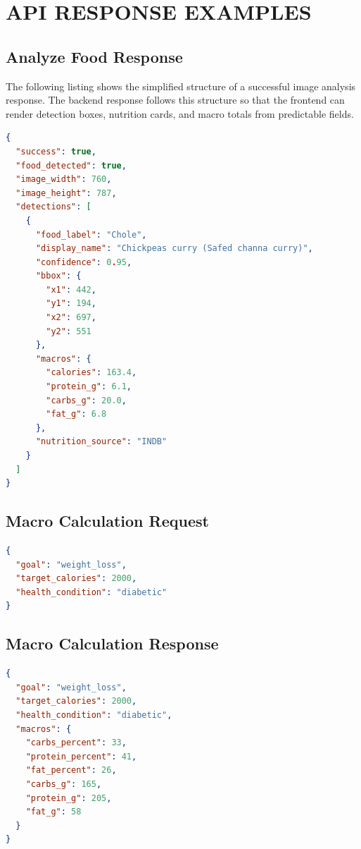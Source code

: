 \chapter{API RESPONSE EXAMPLES}

\section{Analyze Food Response}

The following listing shows the simplified structure of a successful image analysis response. The backend response follows this structure so that the frontend can render detection boxes, nutrition cards, and macro totals from predictable fields.

\begin{lstlisting}[language=json,caption={Simplified food analysis response},label={lst:analysis-response}]
{
  "success": true,
  "food_detected": true,
  "image_width": 760,
  "image_height": 787,
  "detections": [
    {
      "food_label": "Chole",
      "display_name": "Chickpeas curry (Safed channa curry)",
      "confidence": 0.95,
      "bbox": {
        "x1": 442,
        "y1": 194,
        "x2": 697,
        "y2": 551
      },
      "macros": {
        "calories": 163.4,
        "protein_g": 6.1,
        "carbs_g": 20.0,
        "fat_g": 6.8
      },
      "nutrition_source": "INDB"
    }
  ]
}
\end{lstlisting}

\section{Macro Calculation Request}

\begin{lstlisting}[language=json,caption={Macro calculation request},label={lst:macro-request}]
{
  "goal": "weight_loss",
  "target_calories": 2000,
  "health_condition": "diabetic"
}
\end{lstlisting}

\section{Macro Calculation Response}

\begin{lstlisting}[language=json,caption={Macro calculation response},label={lst:macro-response}]
{
  "goal": "weight_loss",
  "target_calories": 2000,
  "health_condition": "diabetic",
  "macros": {
    "carbs_percent": 33,
    "protein_percent": 41,
    "fat_percent": 26,
    "carbs_g": 165,
    "protein_g": 205,
    "fat_g": 58
  }
}
\end{lstlisting}

